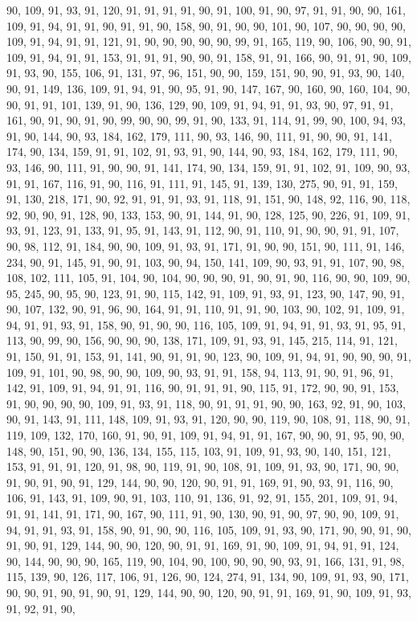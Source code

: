 \begin{sloppypar}
90, 109, 91, 93, 91, 120, 91, 91, 91, 91, 90, 91, 100, 91, 90, 97, 91, 91, 90, 90, 161, 109, 91, 94, 91, 91, 90, 91, 91, 90, 158, 90, 91, 90, 90, 101, 90, 107, 90, 90, 90, 90, 109, 91, 94, 91, 91, 121, 91, 90, 90, 90, 90, 90, 99, 91, 165, 119, 90, 106, 90, 90, 91, 109, 91, 94, 91, 91, 153, 91, 91, 91, 90, 90, 91, 158, 91, 91, 166, 90, 91, 91, 90, 109, 91, 93, 90, 155, 106, 91, 131, 97, 96, 151, 90, 90, 159, 151, 90, 90, 91, 93, 90, 140, 90, 91, 149, 136, 109, 91, 94, 91, 90, 95, 91, 90, 147, 167, 90, 160, 90, 160, 104, 90, 90, 91, 91, 101, 139, 91, 90, 136, 129, 90, 109, 91, 94, 91, 91, 93, 90, 97, 91, 91, 161, 90, 91, 90, 91, 90, 99, 90, 90, 99, 91, 90, 133, 91, 114, 91, 99, 90, 100, 94, 93, 91, 90, 144, 90, 93, 184, 162, 179, 111, 90, 93, 146, 90, 111, 91, 90, 90, 91, 141, 174, 90, 134, 159, 91, 91, 102, 91, 93, 91, 90, 144, 90, 93, 184, 162, 179, 111, 90, 93, 146, 90, 111, 91, 90, 90, 91, 141, 174, 90, 134, 159, 91, 91, 102, 91, 109, 90, 93, 91, 91, 167, 116, 91, 90, 116, 91, 111, 91, 145, 91, 139, 130, 275, 90, 91, 91, 159, 91, 130, 218, 171, 90, 92, 91, 91, 91, 93, 91, 118, 91, 151, 90, 148, 92, 116, 90, 118, 92, 90, 90, 91, 128, 90, 133, 153, 90, 91, 144, 91, 90, 128, 125, 90, 226, 91, 109, 91, 93, 91, 123, 91, 133, 91, 95, 91, 143, 91, 112, 90, 91, 110, 91, 90, 90, 91, 91, 107, 90, 98, 112, 91, 184, 90, 90, 109, 91, 93, 91, 171, 91, 90, 90, 151, 90, 111, 91, 146, 234, 90, 91, 145, 91, 90, 91, 103, 90, 94, 150, 141, 109, 90, 93, 91, 91, 107, 90, 98, 108, 102, 111, 105, 91, 104, 90, 104, 90, 90, 90, 91, 90, 91, 90, 116, 90, 90, 109, 90, 95, 245, 90, 95, 90, 123, 91, 90, 115, 142, 91, 109, 91, 93, 91, 123, 90, 147, 90, 91, 90, 107, 132, 90, 91, 96, 90, 164, 91, 91, 110, 91, 91, 90, 103, 90, 102, 91, 109, 91, 94, 91, 91, 93, 91, 158, 90, 91, 90, 90, 116, 105, 109, 91, 94, 91, 91, 93, 91, 95, 91, 113, 90, 99, 90, 156, 90, 90, 90, 138, 171, 109, 91, 93, 91, 145, 215, 114, 91, 121, 91, 150, 91, 91, 153, 91, 141, 90, 91, 91, 90, 123, 90, 109, 91, 94, 91, 90, 90, 90, 91, 109, 91, 101, 90, 98, 90, 90, 109, 90, 93, 91, 91, 158, 94, 113, 91, 90, 91, 96, 91, 142, 91, 109, 91, 94, 91, 91, 116, 90, 91, 91, 91, 90, 115, 91, 172, 90, 90, 91, 153, 91, 90, 90, 90, 90, 109, 91, 93, 91, 118, 90, 91, 91, 91, 90, 90, 163, 92, 91, 90, 103, 90, 91, 143, 91, 111, 148, 109, 91, 93, 91, 120, 90, 90, 119, 90, 108, 91, 118, 90, 91, 119, 109, 132, 170, 160, 91, 90, 91, 109, 91, 94, 91, 91, 167, 90, 90, 91, 95, 90, 90, 148, 90, 151, 90, 90, 136, 134, 155, 115, 103, 91, 109, 91, 93, 90, 140, 151, 121, 153, 91, 91, 91, 120, 91, 98, 90, 119, 91, 90, 108, 91, 109, 91, 93, 90, 171, 90, 90, 91, 90, 91, 90, 91, 129, 144, 90, 90, 120, 90, 91, 91, 169, 91, 90, 93, 91, 116, 90, 106, 91, 143, 91, 109, 90, 91, 103, 110, 91, 136, 91, 92, 91, 155, 201, 109, 91, 94, 91, 91, 141, 91, 171, 90, 167, 90, 111, 91, 90, 130, 90, 91, 90, 97, 90, 90, 109, 91, 94, 91, 91, 93, 91, 158, 90, 91, 90, 90, 116, 105, 109, 91, 93, 90, 171, 90, 90, 91, 90, 91, 90, 91, 129, 144, 90, 90, 120, 90, 91, 91, 169, 91, 90, 109, 91, 94, 91, 91, 124, 90, 144, 90, 90, 90, 165, 119, 90, 104, 90, 100, 90, 90, 90, 93, 91, 166, 131, 91, 98, 115, 139, 90, 126, 117, 106, 91, 126, 90, 124, 274, 91, 134, 90, 109, 91, 93, 90, 171, 90, 90, 91, 90, 91, 90, 91, 129, 144, 90, 90, 120, 90, 91, 91, 169, 91, 90, 109, 91, 93, 91, 92, 91, 90, 
\end{sloppypar}
